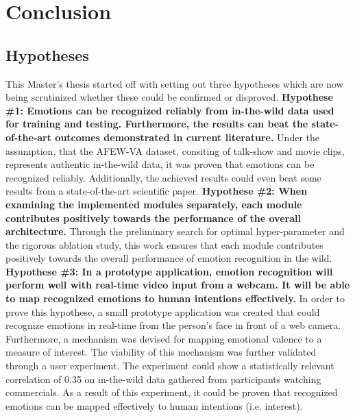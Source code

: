 
\chapter{Conclusion}
\section{Hypotheses}
This Master's thesis started off with setting out three hypotheses which are now being scrutinized whether these could be confirmed or disproved.\newline\newline
\textbf{Hypothese \#1: Emotions can be recognized reliably from in-the-wild data used for training and testing. Furthermore, the results can beat the state-of-the-art outcomes demonstrated in current literature.}\newline
Under the assumption, that the AFEW-VA dataset, consiting of talk-show and movie clips, represents authentic in-the-wild data, it was proven that emotions can be recognized reliably. Additionally, the achieved results could even beat some results from a state-of-the-art scientific paper.
\newline\newline
\textbf{Hypothese \#2: When examining the implemented modules separately, each module contributes positively towards the performance of the overall architecture.}\newline
Through the preliminary search for optimal hyper-parameter and the rigorous ablation study, this work ensures that each module contributes positively towards the overall performance of emotion recognition in the wild.
\newline\newline
\textbf{Hypothese \#3: In a prototype application, emotion recognition will perform well with real-time video input from a webcam. It will be able to map recognized emotions to human intentions effectively.}\newline
In order to prove this hypothese, a small prototype application was created that could recognize emotions in real-time from the person's face in front of a web camera. Furthermore, a mechanism was devised for mapping emotional valence to a measure of interest. The viability of this mechanism was further validated through a user experiment. The experiment could show a statistically relevant correlation of 0.35 on in-the-wild data gathered from participants watching commercials. As a result of this experiment, it could be proven that recognized emotions can be mapped effectively to human intentions (i.e. interest).



